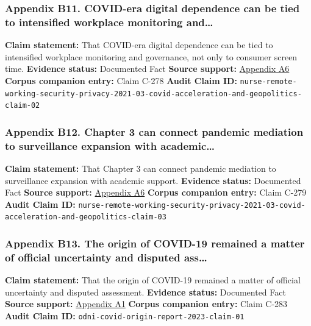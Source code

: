 \documentclass[
  american,
  11pt,
  letterpaper,
]{article}
\begin{document}
\subsubsection{Appendix B11. COVID-era digital dependence can be tied to
intensified workplace monitoring
and\ldots{}}\label{appendix-b11-covid-era-digital-dependence-can-be-tied-to-intensified-workplace-monitoring-and}

\textbf{Claim statement:} That COVID-era digital dependence can be tied
to intensified workplace monitoring and governance, not only to consumer
screen time. \textbf{Evidence status:} Documented Fact \textbf{Source
support:}
\hyperref[appendix-a6-remote-working-pre-and-post-covid-19-an-analysis-of-new-threats-and-risks-to-security-and-privacy]{Appendix
A6} \textbf{Corpus companion entry:} Claim C-278 \textbf{Audit Claim
ID:}
\texttt{nurse-remote-working-security-privacy-2021-03-covid-acceleration-and-geopolitics-claim-02}

\subsubsection{Appendix B12. Chapter 3 can connect pandemic mediation to
surveillance expansion with
academic\ldots{}}\label{appendix-b12-chapter-3-can-connect-pandemic-mediation-to-surveillance-expansion-with-academic}

\textbf{Claim statement:} That Chapter 3 can connect pandemic mediation
to surveillance expansion with academic support. \textbf{Evidence
status:} Documented Fact \textbf{Source support:}
\hyperref[appendix-a6-remote-working-pre-and-post-covid-19-an-analysis-of-new-threats-and-risks-to-security-and-privacy]{Appendix
A6} \textbf{Corpus companion entry:} Claim C-279 \textbf{Audit Claim
ID:}
\texttt{nurse-remote-working-security-privacy-2021-03-covid-acceleration-and-geopolitics-claim-03}

\subsubsection{Appendix B13. The origin of COVID-19 remained a matter of
official uncertainty and disputed
ass\ldots{}}\label{appendix-b13-the-origin-of-covid-19-remained-a-matter-of-official-uncertainty-and-disputed-ass}

\textbf{Claim statement:} That the origin of COVID-19 remained a matter
of official uncertainty and disputed assessment. \textbf{Evidence
status:} Documented Fact \textbf{Source support:}
\hyperref[appendix-a1-report-on-potential-links-between-the-wuhan-institute-of-virology-and-the-origins-of-covid-19]{Appendix
A1} \textbf{Corpus companion entry:} Claim C-283 \textbf{Audit Claim
ID:} \texttt{odni-covid-origin-report-2023-claim-01}
\end{document}
